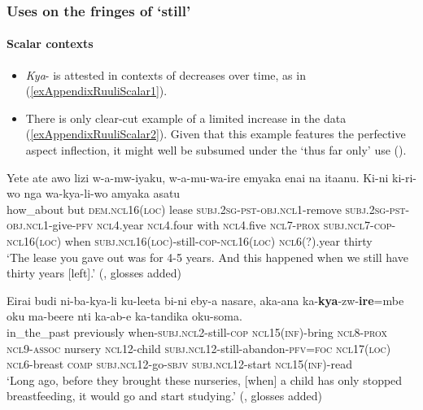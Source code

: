 \subsubsection{Uses on the fringes of \lq still\rq{}}
\paragraph{Scalar contexts}
\label{appendixRuuliScalar}
\begin{itemize}
	\item \textit{Kya}- is attested in contexts of decreases over time, as in (\ref{exAppendixRuuliScalar1}).
	\item There is only clear-cut example of a limited increase in the data (\ref{exAppendixRuuliScalar2}). Given that this example features the perfective aspect inflection, it might well be subsumed under the \lq thus far only\rq{ }use ().
\end{itemize}

\begin{exe}
	\ex\label{exAppendixRuuliScalar1}
	\gll Yete ate awo lizi w-a-mw-iyaku, w-a-mu-wa-ire emyaka enai na itaanu. Ki-ni ki-ri-wo nga wa-kya-li-wo amyaka asatu\\
how\_about but \textsc{dem}.\textsc{ncl}16(\textsc{loc}) lease \textsc{subj}.2\textsc{sg}-\textsc{pst}-\textsc{obj}.\textsc{ncl}1-remove \textsc{subj}.2\textsc{sg}-\textsc{pst}-\textsc{obj}.\textsc{ncl}1-give-\textsc{pfv} \textsc{ncl}4.year \textsc{ncl}4.four with \textsc{ncl}4.five \textsc{ncl}7-\textsc{prox} \textsc{subj}.\textsc{ncl}7-\textsc{cop}-\textsc{ncl}16(\textsc{loc}) when \textsc{subj}.\textsc{ncl}16(\textsc{loc})-still-\textsc{cop}-\textsc{ncl}16(\textsc{loc}) \textsc{ncl}6(?).year thirty\\
\glt \lq The lease you gave out was for 4-5 years. And this happened when we still have thirty years [left].\rq{} (\cite{RuuliCorpus}, glosses added)

	\ex\label{exAppendixRuuliScalar2}
	\gll Eirai budi ni-ba-kya-li ku-leeta bi-ni eby-a nasare, aka-ana ka-\textbf{kya}-zw-\textbf{ire}=mbe oku ma-beere nti ka-ab-e ka-tandika oku-soma.\\
	in\_the\_past previously when-\textsc{subj}.\textsc{ncl}2-still-\textsc{cop} \textsc{ncl}15(\textsc{inf})-bring \textsc{ncl}8-\textsc{prox} \textsc{ncl}9-\textsc{assoc} nursery \textsc{ncl}12-child \textsc{subj}.\textsc{ncl}12-still-abandon-\textsc{pfv}=\textsc{foc} \textsc{ncl}17(\textsc{loc}) \textsc{ncl}6-breast \textsc{comp} \textsc{subj}.\textsc{ncl}12-go-\textsc{sbjv} \textsc{subj}.\textsc{ncl}12-start \textsc{ncl}15(\textsc{inf})-read\\
	\glt \lq Long ago, before they brought these nurseries, [when] a child has only stopped breastfeeding, it would go and start studying.\rq{ }(\cite{RuuliCorpus}, glosses added)
\end{exe}




